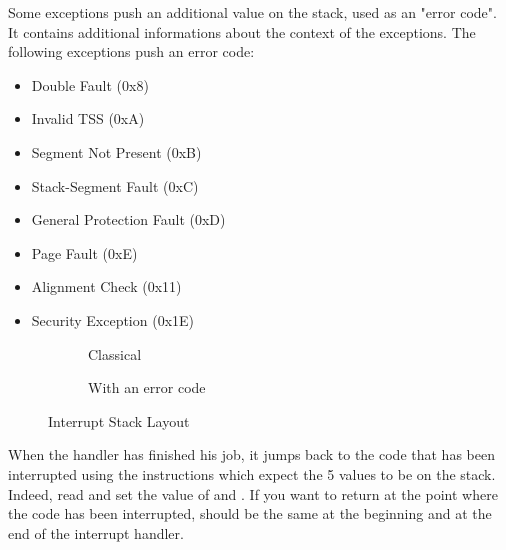 Some exceptions push an additional value on the stack, used as an "error code".
It contains additional informations about the context of the exceptions. The
following exceptions push an error code:
\begin{multicols}{2}
  \begin{itemize}
    \item Double Fault (0x8)
    \item Invalid TSS (0xA)
    \item Segment Not Present (0xB)
    \item Stack-Segment Fault (0xC)
    \item General Protection Fault (0xD)
    \item Page Fault (0xE)
    \item Alignment Check (0x11)
    \item Security Exception (0x1E)
  \end{itemize}
\end{multicols}

\begin{figure}
  \hspace{-1.5cm}
  \begin{subfigure}{.5\textwidth}
    \begin{drawstack}[scale=.75]
      \startframe
       
       
       
       
       \esp
    \end{drawstack}
    \caption{Classical}
  \end{subfigure}
  \begin{subfigure}{.5\textwidth}
    \begin{drawstack}[scale=.75]
      \startframe
       
       
       
       
       
       \esp
    \end{drawstack}
    \caption{With an error code}
  \end{subfigure}
  \caption{Interrupt Stack Layout}
\end{figure}

When the handler has finished his job, it jumps back to the code that has been
interrupted using the  instructions which expect the 5 values to be
on the stack. Indeed,  read and set the value of  and . If you want to return at the point where the code
has been interrupted,  should be the same at the beginning and at the
end of the interrupt handler.

